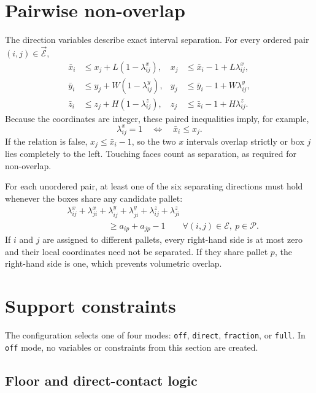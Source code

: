 \documentclass[11pt]{article}
\newcommand{\Pallets}{\mathcal P}
\newcommand{\Pairs}{\mathcal E}
\newcommand{\OPairs}{\overrightarrow{\mathcal E}}
\begin{document}
\section{Pairwise non-overlap}

The direction variables describe exact interval separation.  For every
ordered pair $(i,j)\in\OPairs$,
\begin{align}
 \bar x_i&\le x_j+L(1-\lambda^x_{ij}),&
 x_j&\le\bar x_i-1+L\lambda^x_{ij},\label{eq:x-direction}\\
 \bar y_i&\le y_j+W(1-\lambda^y_{ij}),&
 y_j&\le\bar y_i-1+W\lambda^y_{ij},\label{eq:y-direction}\\
 \bar z_i&\le z_j+H(1-\lambda^z_{ij}),&
 z_j&\le\bar z_i-1+H\lambda^z_{ij}.
 \label{eq:z-direction}
\end{align}
Because the coordinates are integer, these paired inequalities imply, for
example,
\begin{equation}
 \lambda^x_{ij}=1\quad\Longleftrightarrow\quad \bar x_i\le x_j.
\end{equation}
If the relation is false, $x_j\le\bar x_i-1$, so the two $x$ intervals overlap
strictly or box $j$ lies completely to the left.  Touching faces count as
separation, as required for non-overlap.

For each unordered pair, at least one of the six separating directions must
hold whenever the boxes share any candidate pallet:
\begin{align}
 &\lambda^x_{ij}+\lambda^x_{ji}
 +\lambda^y_{ij}+\lambda^y_{ji}
 +\lambda^z_{ij}+\lambda^z_{ji}\nonumber\\
 &\hspace{2cm}\ge a_{ip}+a_{jp}-1
 \qquad\forall(i,j)\in\Pairs,\ p\in\Pallets.
 \label{eq:nonoverlap}
\end{align}
If $i$ and $j$ are assigned to different pallets, every right-hand side is at
most zero and their local coordinates need not be separated.  If they share
pallet $p$, the right-hand side is one, which prevents volumetric overlap.

\section{Support constraints}
\label{sec:support}

The configuration selects one of four modes: \texttt{off}, \texttt{direct},
\texttt{fraction}, or \texttt{full}.  In \texttt{off} mode, no variables or
constraints from this section are created.

\subsection{Floor and direct-contact logic}
\end{document}
